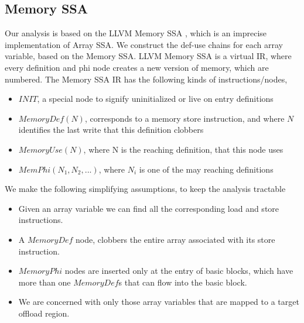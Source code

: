 \subsection{Memory SSA} Our analysis is based on the LLVM 
 Memory SSA \cite{llvm-memoryssa-url} \cite{Novillo_memoryssa}, 
 which is an imprecise 
implementation of Array SSA\cite{Knobe:1998:ASF:268946.268956}.
We construct the def-use chains for each array variable, 
based on the Memory SSA. 
LLVM Memory SSA is a virtual IR, where every definition and phi 
node creates a new version of memory, which are numbered.
The Memory SSA IR has the following kinds of instructions/nodes, 
\begin{itemize}
 \item $INIT$, a special node to signify uninitialized or live on 
 entry definitions
 \item $MemoryDef(N)$, corresponds to a memory store
 instruction, and where $N$ identifies the last write that this 
 definition clobbers
 \item $MemoryUse(N)$, where N is the reaching definition, that 
 this node uses
 \item $MemPhi(N_1,N_2,...)$, where $N_i$ is one of the  
 may reaching definitions
\end{itemize}
We make the following simplifying assumptions, to keep the analysis
tractable
\begin{itemize}
 \item Given an array variable we can find all the  corresponding
 load and store instructions.
 \item A $MemoryDef$ node, clobbers the entire array associated 
 with its store instruction.
 \item $MemoryPhi$ nodes are inserted only at the entry 
 of basic blocks, which have more than one $MemoryDef$s that can 
 flow into the basic block.
 \item We are concerned with only those array variables that 
 are mapped to a target offload region. 
\end{itemize}
